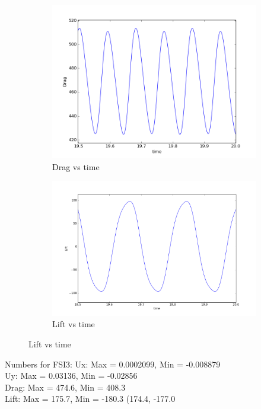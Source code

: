 \begin{figure}[!ht]
\begin{subfigure}[b]{0.47\linewidth}
\includegraphics[width=\linewidth]{figures/FSI3/medium/Drag2}\caption{Drag vs time}
\end{subfigure}
\begin{subfigure}[b]{0.53\linewidth}
\includegraphics[width=\linewidth]{figures/FSI3/medium/Lift2}\caption{Lift vs time}
\end{subfigure}
\end{figure}

Numbers for FSI3:
Ux: Max = 0.0002099, Min = -0.008879 \\
Uy: Max = 0.03136, Min = -0.02856 \\
Drag: Max = 474.6, Min = 408.3 \\
Lift: Max = 175.7, Min = -180.3 (174.4, -177.0\\

